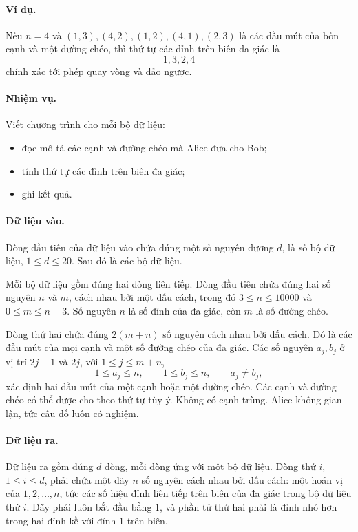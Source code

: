 \documentclass[11pt]{article}
\begin{document}
\paragraph{Ví dụ.}
Nếu \(n=4\) và \((1,3),(4,2),(1,2),(4,1),(2,3)\) là các đầu mút của bốn cạnh
và một đường chéo, thì thứ tự các đỉnh trên biên đa giác là
\[
  1,3,2,4
\]
chính xác tới phép quay vòng và đảo ngược.

\paragraph{Nhiệm vụ.}
Viết chương trình cho mỗi bộ dữ liệu:
\begin{itemize}
  \item đọc mô tả các cạnh và đường chéo mà Alice đưa cho Bob;
  \item tính thứ tự các đỉnh trên biên đa giác;
  \item ghi kết quả.
\end{itemize}

\paragraph{Dữ liệu vào.}
Dòng đầu tiên của dữ liệu vào chứa đúng một số nguyên dương \(d\), là số bộ dữ
liệu, \(1\le d\le 20\). Sau đó là các bộ dữ liệu.

Mỗi bộ dữ liệu gồm đúng hai dòng liên tiếp. Dòng đầu tiên chứa đúng hai số
nguyên \(n\) và \(m\), cách nhau bởi một dấu cách, trong đó \(3\le n\le 10000\)
và \(0\le m\le n-3\). Số nguyên \(n\) là số đỉnh của đa giác, còn \(m\) là số
đường chéo.

Dòng thứ hai chứa đúng \(2(m+n)\) số nguyên cách nhau bởi dấu cách. Đó là các
đầu mút của mọi cạnh và một số đường chéo của đa giác. Các số nguyên
\(a_j,b_j\) ở vị trí \(2j-1\) và \(2j\), với \(1\le j\le m+n\),
\[
  1\le a_j\le n,\qquad 1\le b_j\le n,\qquad a_j\ne b_j,
\]
xác định hai đầu mút của một cạnh hoặc một đường chéo. Các cạnh và đường chéo
có thể được cho theo thứ tự tùy ý. Không có cạnh trùng. Alice không gian lận,
tức câu đố luôn có nghiệm.

\paragraph{Dữ liệu ra.}
Dữ liệu ra gồm đúng \(d\) dòng, mỗi dòng ứng với một bộ dữ liệu. Dòng thứ
\(i\), \(1\le i\le d\), phải chứa một dãy \(n\) số nguyên cách nhau bởi dấu
cách: một hoán vị của \(1,2,\ldots,n\), tức các số hiệu đỉnh liên tiếp trên
biên của đa giác trong bộ dữ liệu thứ \(i\). Dãy phải luôn bắt đầu bằng \(1\),
và phần tử thứ hai phải là đỉnh nhỏ hơn trong hai đỉnh kề với đỉnh \(1\) trên
biên.
\end{document}
